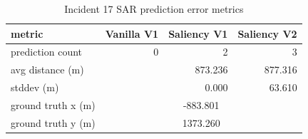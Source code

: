 \begin{table}[ht]
\centering
\caption{Incident 17 SAR prediction error metrics}
\label{tab:sar-incident-17}
\begin{tabular}{lrrr}
\hline
metric & Vanilla V1 & Saliency V1 & Saliency V2 \\
\hline
prediction count & 0 & 2 & 3 \\
avg distance (m) &  & 873.236 & 877.316 \\
stddev (m) &  & 0.000 & 63.610 \\
ground truth x (m) & \multicolumn{3}{c}{-883.801} \\
ground truth y (m) & \multicolumn{3}{c}{1373.260} \\
\hline
\end{tabular}
\end{table}
